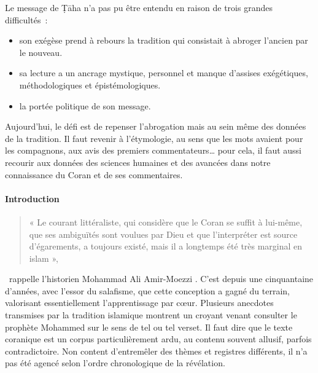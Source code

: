 Le message de Ṭāha n'a pas pu être entendu en raison de trois grandes
difficultés~:
\begin{itemize}
    \item son exégèse prend à rebours la tradition qui consistait à abroger
l'ancien par le nouveau.
\item sa lecture a un ancrage mystique, personnel et manque d'assises
exégétiques, méthodologiques et épistémologiques.
\item la portée politique de son message.
\end{itemize}


Aujourd'hui, le défi est de repenser l'abrogation mais au sein même des
données de la tradition. Il faut revenir à l'étymologie, au sens que les
mots avaient pour les compagnons, aux avis des premiers
commentateurs\ldots{} pour cela, il faut aussi recourir aux données des
sciences humaines et des avancées dans notre connaissance du Coran et de
ses commentaires.


 
 



 


\paragraph{Introduction}
\begin{quote}
    {« Le courant littéraliste, qui considère que le Coran se suffit à
lui-même, que ses ambiguïtés sont voulues par Dieu et que l'interpréter
est source d'égarements, a toujours existé, mais il a longtemps été très
marginal en islam »,}
\end{quote}
~rappelle l'historien Mohammad
Ali Amir-Moezzi 
 . C'est depuis une cinquantaine d'années, avec
l'essor du salafisme, que cette conception a gagné du terrain,
valorisant essentiellement l'apprentissage par cœur.
Plusieurs anecdotes transmises par la tradition islamique montrent un
croyant venant consulter le prophète Mohammed sur le sens de tel ou tel
verset. Il faut dire que le texte coranique est un corpus
particulièrement ardu, au contenu souvent allusif, parfois
contradictoire. Non content d'entremêler des thèmes et registres
différents, il n'a pas été agencé selon l'ordre chronologique de la
révélation.

